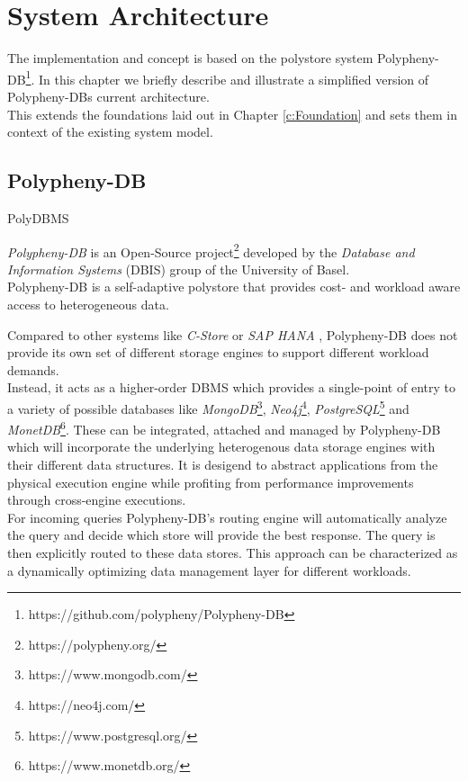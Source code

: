 \chapter{System Architecture}
\label{c:architecture}

The implementation and concept is based on the polystore system Polypheny-DB\footnote{https://github.com/polypheny/Polypheny-DB}.
In this chapter we briefly describe and illustrate a simplified version of Polypheny-DBs current architecture.\\
This extends the foundations laid out in Chapter \ref{c:Foundation} and sets them in context of the existing system model.






\section{Polypheny-DB}
PolyDBMS \cite{polypheny2021}

\textit{Polypheny-DB} is an Open-Source project\footnote{https://polypheny.org/} developed by 
the \textit{Database and Information Systems} (DBIS) group of the University of Basel.\\

Polypheny-DB is a self-adaptive polystore that provides cost- and workload aware access to heterogeneous data\cite{poly2020}.

Compared to other systems like \textit{C-Store}\cite{cstore_2005} or \textit{SAP HANA} \cite{hana_2012}, 
Polypheny-DB does not provide its own set of different storage engines to support 
different workload demands.\\
Instead, it acts as a higher-order DBMS which provides a single-point of entry to 
a variety of possible databases like 
\textit{MongoDB}\footnote{https://www.mongodb.com/}, 
\textit{Neo4j}\footnote{https://neo4j.com/},
\textit{PostgreSQL}\footnote{https://www.postgresql.org/} 
and \textit{MonetDB}\footnote{https://www.monetdb.org/}. 
These can be integrated, attached and managed by Polypheny-DB which will incorporate the underlying 
heterogenous data storage engines with their different data structures. 
It is desigend to abstract applications from the physical execution engine while profiting from 
performance improvements through cross-engine executions. 
\\
For incoming queries Polypheny-DB's routing engine will automatically analyze the query and decide 
which store will provide the best response. The query is then explicitly routed to these data stores. 
This approach can be characterized as a dynamically optimizing data management layer for different workloads.

